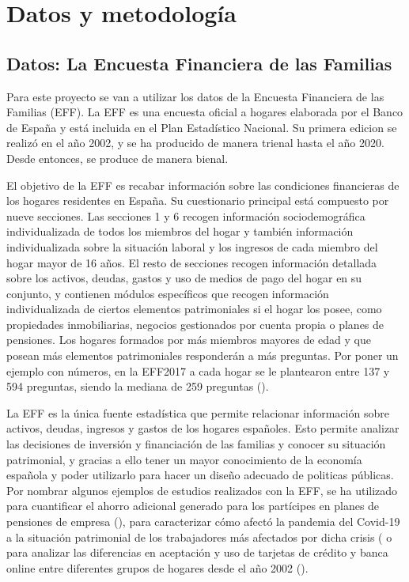 \chapter{Datos y metodología}
\label{chapter:datos_metodologia}

\section{Datos: La Encuesta Financiera de las Familias}\label{section:datos}

Para este proyecto se van a utilizar los datos de la Encuesta Financiera de las Familias (EFF). La EFF es una encuesta oficial a hogares elaborada por el Banco de España y está incluida en el Plan Estadístico Nacional. Su primera edicion se realizó en el año 2002, y se ha producido de manera trienal hasta el año 2020. Desde entonces, se produce de manera bienal.

El objetivo de la EFF es recabar información sobre las condiciones financieras de los hogares residentes en España. Su cuestionario principal está compuesto por nueve secciones. Las secciones 1 y 6 recogen información sociodemográfica individualizada de todos los miembros del hogar y también información individualizada sobre la situación laboral y los ingresos de cada miembro del hogar mayor de 16 años. El resto de secciones recogen información detallada sobre los activos, deudas, gastos y uso de medios de pago del hogar en su conjunto, y contienen módulos específicos que recogen información individualizada de ciertos elementos patrimoniales si el hogar los posee, como propiedades inmobiliarias, negocios gestionados por cuenta propia o planes de pensiones. Los hogares formados por más miembros mayores de edad y que posean más elementos patrimoniales responderán a más preguntas. Por poner un ejemplo con números, en la EFF2017 a cada hogar se le plantearon entre 137 y 594 preguntas, siendo la mediana de 259 preguntas (\cite{effmethod2017}).

La EFF es la única fuente estadística que permite relacionar información sobre activos, deudas, ingresos y gastos de los hogares españoles. Esto permite analizar las decisiones de inversión y financiación de las familias y conocer su situación patrimonial, y gracias a ello tener un mayor conocimiento de la economía española y poder utilizarlo para hacer un diseño adecuado de politicas públicas. Por nombrar algunos ejemplos de estudios realizados con la EFF, se ha utilizado para cuantificar el ahorro adicional generado para los partícipes en planes de pensiones de empresa (\cite{gomez2022pensiones}), para caracterizar cómo afectó la pandemia del Covid-19 a la situación patrimonial de los trabajadores más afectados por dicha crisis (\cite{alvargonzalez2020pandemia} o para analizar las diferencias en aceptación y uso de tarjetas de crédito y banca online entre diferentes grupos de hogares desde el año 2002 (\cite{crespo2023bancaonline}).

